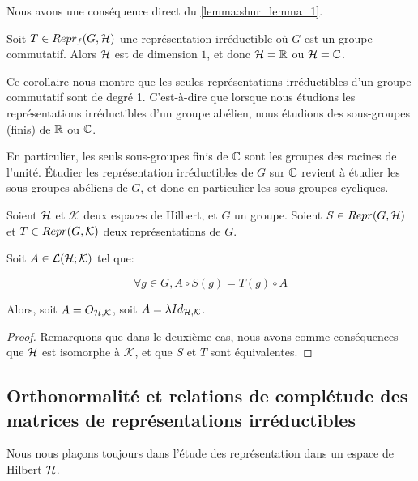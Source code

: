 Nous avons une conséquence direct du \ref{lemma:shur_lemma_1}.

\begin{corollary}
	Soit $T \in Repr_{f}(G, \mathcal{H})$ une représentation irréductible où $G$
	est un groupe commutatif. Alors $\mathcal{H}$ est de dimension $1$, et donc
	$\mathcal{H} = \mathbb{R}$ ou $\mathcal{H} = \mathbb{C}$.
\end{corollary}

Ce corollaire nous montre que les seules représentations irréductibles d'un
groupe commutatif sont de degré 1. C'est-à-dire que lorsque nous étudions les
représentations irréductibles d'un groupe abélien, nous étudions des
sous-groupes (finis) de $\mathbb{R}$ ou $\mathbb{C}$.

En particulier, les seuls sous-groupes finis de $\mathbb{C}$ sont les groupes des
racines de l'unité. Étudier les représentation irréductibles de $G$ sur
$\mathbb{C}$ revient à étudier les sous-groupes abéliens de $G$, et donc en
particulier les sous-groupes cycliques.

\begin{proposition} 
	\label{lemma:shur_lemma_2}
	Soient $\mathcal{H}$ et $\mathcal{K}$ deux espaces de Hilbert, et $G$ un groupe.
	Soient $S \in Repr(G, \mathcal{H})$ et $T \in Repr(G, \mathcal{K})$ deux
	représentations de $G$.

	Soit $A \in \mathcal{L}(\mathcal{H}; \mathcal{K})$ tel que:

	\begin{equation*}
		\forall g \in G, A \circ S(g) = T(g) \circ A
	\end{equation*}

	Alors, soit $A = O_{\mathcal{H}, \mathcal{K}}$, soit $A = \lambda Id_{\mathcal{H},
		\mathcal{K}}$.
\end{proposition}

\ifdefined\outputproof
\begin{proof}
	Remarquons que dans le deuxième cas, nous avons comme conséquences que
	$\mathcal{H}$ est isomorphe à $\mathcal{K}$, et que $S$ et $T$ sont
	équivalentes.
\end{proof}
\fi

\subsection{Orthonormalité et relations de complétude des matrices de
représentations irréductibles}

Nous nous plaçons toujours dans l'étude des représentation dans un espace de
Hilbert $\mathcal{H}$.



